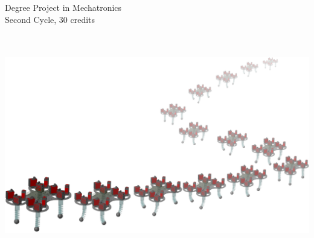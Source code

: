 \begin{titlepage}
    \begin{flushleft}
    \fontsize{14}{13}\upshape Degree Project in Mechatronics \\
    \vspace{8pt}
    \upshape Second Cycle, 30 credits ~\\
    \vspace{40pt}
    {\fontsize{25}{20}\bf\sffamily\@title\\}
    \vspace{30pt}
    {\fontsize{20}{18}\sffamily \@author\\}
    \end{flushleft}
    
\vspace*{1em}
\hspace*{-0.2\textwidth}
\begin{center}
    \includegraphics[width=0.8\paperwidth]{setup/img/robot_walk.pdf}
\end{center}


\end{titlepage}
